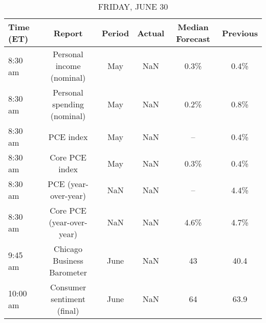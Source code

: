 \documentclass{article}%
\begin{document}
\begin{table}[htbp]%
\caption{FRIDAY, JUNE 30}%
\centering%
\begin{adjustbox}{width=1\textwidth}%
\begin{tabular}{lccccc}
\toprule
Time (ET) &                      Report & Period & Actual & Median Forecast & Previous \\
\midrule
  8:30 am &   Personal income (nominal) &    May &    NaN &            0.3\% &     0.4\% \\
  8:30 am & Personal spending (nominal) &    May &    NaN &            0.2\% &     0.8\% \\
  8:30 am &                   PCE index &    May &    NaN &              -- &     0.4\% \\
  8:30 am &              Core PCE index &    May &    NaN &            0.3\% &     0.4\% \\
  8:30 am &        PCE (year-over-year) &    NaN &    NaN &              -- &     4.4\% \\
  8:30 am &   Core PCE (year-over-year) &    NaN &    NaN &            4.6\% &     4.7\% \\
  9:45 am &  Chicago Business Barometer &   June &    NaN &              43 &     40.4 \\
 10:00 am &  Consumer sentiment (final) &   June &    NaN &              64 &     63.9 \\
\bottomrule
\end{tabular}
%
\end{adjustbox}%
\end{table}
\end{document}

